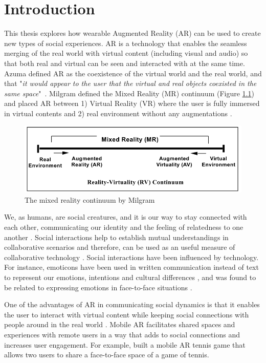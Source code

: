 \chapter{Introduction}
\label{ch:intro}

This thesis explores how wearable Augmented Reality (AR) can be used to create new types of social experiences. AR is a technology that enables the seamless merging of the real world with virtual content (including visual and audio) so that both real and virtual can be seen and interacted with at the same time. Azuma defined AR as the coexistence of the virtual world and the real world, and that "\textit{it would appear to the user that the virtual and real objects coexisted in the same space}"~\cite{azuma1997survey}. Milgram defined the Mixed Reality (MR) continuum (Figure \ref{fig:mr-continuum}) and placed AR between 1) Virtual Reality (VR) where the user is fully immersed in virtual contents and 2) real environment without any augmentations \cite{Milgram1995a}. 

\begin{figure}[H]
    \centering
    \includegraphics[width=0.8\linewidth]{images/10-intro/mixed-reality-continuum.png}
    \caption{The mixed reality continuum by Milgram \cite{Milgram1995a}}
    \label{fig:mr-continuum}
\end{figure}

We, as humans, are social creatures, and it is our way to stay connected with each other, communicating our identity and the feeling of relatedness to one another \cite{HuangWeidong2013}. Social interactions help to establish mutual understandings in collaborative scenarios and therefore, can be used as an useful measure of collaborative technology \cite{Li2013}. Social interactions have been influenced by technology. For instance, emoticons have been used in written communication instead of text to represent our emotions, intentions and cultural differences \cite{Pavalanathan2016}, and was found to be related to expressing emotions in face-to-face situations \cite{Derks2007}. 

One of the advantages of AR in communicating social dynamics is that it enables the user to interact with virtual content while keeping social connections with people around in the real world \cite{HuangWeidong2013}. Mobile AR facilitates shared spaces and experiences with remote users in a way that adds to social connections and increases user engagement. For example, \textcite{Henrysson2005a} built a mobile AR tennis game that allows two users to share a face-to-face space of a game of tennis. 

